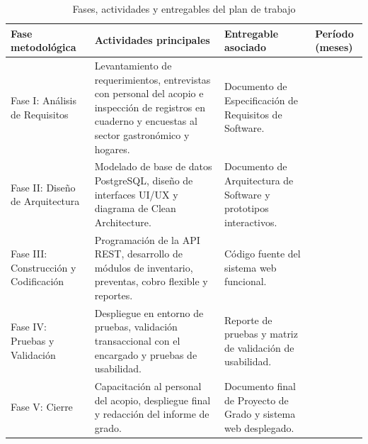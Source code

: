 \begin{table}[H]
  \centering
  \caption{Fases, actividades y entregables del plan de trabajo}
  \label{tab:plan-trabajo}
  \begin{tabular}{>{\raggedright\arraybackslash}p{3.0cm} >{\raggedright\arraybackslash}p{6.2cm} >{\raggedright\arraybackslash}p{3.8cm} >{\raggedright\arraybackslash}p{1.6cm}}
    \toprule
    \textbf{Fase metodológica} & \textbf{Actividades principales} & \textbf{Entregable asociado} & \textbf{Período (meses)} \\
    \midrule
    Fase I: Análisis de Requisitos & Levantamiento de requerimientos, entrevistas con personal del acopio e inspección de registros en cuaderno y encuestas al sector gastronómico y hogares. & Documento de Especificación de Requisitos de Software. & \\
    \midrule
    Fase II: Diseño de Arquitectura & Modelado de base de datos PostgreSQL, diseño de interfaces UI/UX y diagrama de Clean Architecture. & Documento de Arquitectura de Software y prototipos interactivos. & \\
    \midrule
    Fase III: Construcción y Codificación & Programación de la API REST, desarrollo de módulos de inventario, preventas, cobro flexible y reportes. & Código fuente del sistema web funcional. & \\
    \midrule
    Fase IV: Pruebas y Validación & Despliegue en entorno de pruebas, validación transaccional con el encargado y pruebas de usabilidad. & Reporte de pruebas y matriz de validación de usabilidad. & \\
    \midrule
    Fase V: Cierre & Capacitación al personal del acopio, despliegue final y redacción del informe de grado. & Documento final de Proyecto de Grado y sistema web desplegado. & \\
    \bottomrule
  \end{tabular}
\end{table}
